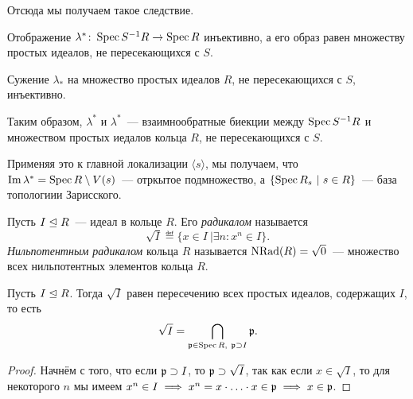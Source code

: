 	Отсюда мы получаем такое следствие. 

	\begin{corollary}
		Отображение $\lambda^*\colon \operatorname{Spec}{S^{-1}R} \to \operatorname{Spec}{R}$ инъективно, а его образ равен множеству простых идеалов, не пересекающихся с $S$. 

		Сужение $\lambda_*$ на множество простых идеалов $R$, не пересекающихся с $S$, инъективно.

		Таким образом, $\lambda^{*}$ и $\lambda^{*}$~--- взаимнообратные биекции между $\operatorname{Spec}{S^{-1}R}$ и множеством простых иедалов кольца $R$, не пересекающихся с $S$.
	\end{corollary}

	Применяя это к главной локализации $\langle s \rangle$, мы получаем, что $\mathop{\mathrm{Im}}\nolimits{\lambda^{*}} = \operatorname{Spec}{R}\setminus V(s)$~--- отркытое подмножество, а  $\{ \operatorname{Spec}{R_{s}} \ \vert \ s \in R\}$~--- база топологиии Зарисского. 

	\begin{definition} 
		Пусть $I \trianglelefteq R$~--- идеал в кольце $R$. Его \emph{радикалом} называется 
		\[
			\sqrt{I} \eqdef \{x \in I \ \vert \exists n \colon x^n \in I  \}.
		\]
		\emph{Нильпотентным радикалом} кольца $R$ называется $\operatorname{NRad}(R) = \sqrt{0}$~---  множество всех нильпотентных элементов кольца $R$. 
	\end{definition}

	\begin{theorem} 
		Пусть $I \trianglelefteq R$. Тогда $\sqrt{I}$ равен пересечению всех простых идеалов, содержащих $I$, то есть 
		\[
			\sqrt{I} = \bigcap_{\mathfrak{p} \in \operatorname{Spec}{R}, \ \mathfrak{p} \supset I} \mathfrak{p}. 
		\]
	\end{theorem}
	\begin{proof}
		Начнём с того, что если $\mathfrak{p} \supset I$, то $\mathfrak{p} \supset \sqrt{I}$, так как если $x \in \sqrt{I}$, то для некоторого $n$ мы имеем $x^n \in I \implies x^n = x \cdot \ldots \cdot x \in \mathfrak{p} \implies x \in \mathfrak{p}$.

		
	\end{proof}






